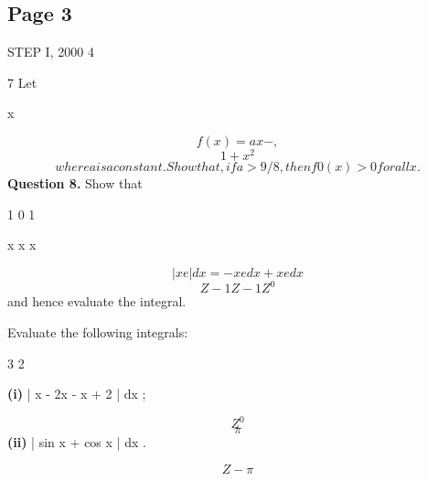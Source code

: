 \documentclass[12pt]{article}
\begin{document}
\subsection*{Page 3}
\begin{flushleft}
STEP I, 2000 4\par
7 Let\par
x\par
\[f (x) = ax - ,\]
\[1 + x^2\]
\[where a is a constant. Show that, if a > 9/8, then f 0 (x) > 0 for all x.\]
\bigskip\textbf{Question 8.} Show that\par
1 0 1\par
x x x\par
\[| x e | dx = - x e dx + x e dx\]
\[Z-1 Z-1 Z^0\]
and hence evaluate the integral.\par
Evaluate the following integrals:\par
3 2\par
\textbf{(i)} | x - 2x - x + 2 | dx ;\par
\[Z^0\]
\[\pi\]
\textbf{(ii)} | sin x + cos x | dx .\par
\[Z-\pi\]
\end{flushleft}
\end{document}
